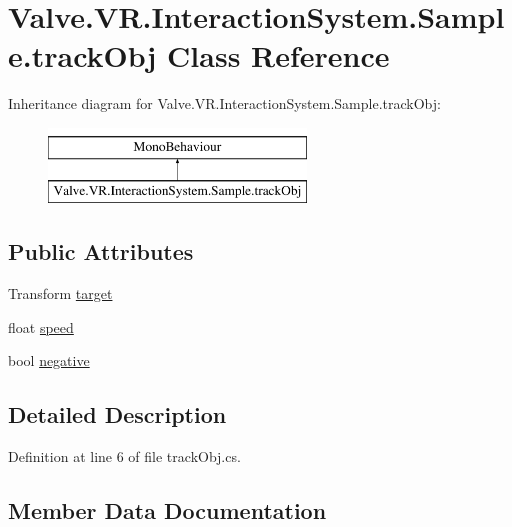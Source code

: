 \hypertarget{class_valve_1_1_v_r_1_1_interaction_system_1_1_sample_1_1track_obj}{}\section{Valve.\+V\+R.\+Interaction\+System.\+Sample.\+track\+Obj Class Reference}
\label{class_valve_1_1_v_r_1_1_interaction_system_1_1_sample_1_1track_obj}
Inheritance diagram for Valve.\+V\+R.\+Interaction\+System.\+Sample.\+track\+Obj\+:\begin{figure}[H]
\begin{center}
\leavevmode
\includegraphics[height=2.000000cm]{class_valve_1_1_v_r_1_1_interaction_system_1_1_sample_1_1track_obj}
\end{center}
\end{figure}
\subsection*{Public Attributes}
\begin{DoxyCompactItemize}
\item 
Transform \mbox{\hyperlink{class_valve_1_1_v_r_1_1_interaction_system_1_1_sample_1_1track_obj_a3edc57cc2c2e60505a534752ea3dadc8}{target}}
\item 
float \mbox{\hyperlink{class_valve_1_1_v_r_1_1_interaction_system_1_1_sample_1_1track_obj_aa30e41c109c0185c86ba76029ea1cb0f}{speed}}
\item 
bool \mbox{\hyperlink{class_valve_1_1_v_r_1_1_interaction_system_1_1_sample_1_1track_obj_a20a49785b3eba23aea66afd1a60608fa}{negative}}
\end{DoxyCompactItemize}


\subsection{Detailed Description}


Definition at line 6 of file track\+Obj.\+cs.



\subsection{Member Data Documentation}
\mbox{\label{class_valve_1_1_v_r_1_1_interaction_system_1_1_sample_1_1track_obj_a20a49785b3eba23aea66afd1a60608fa}} 
